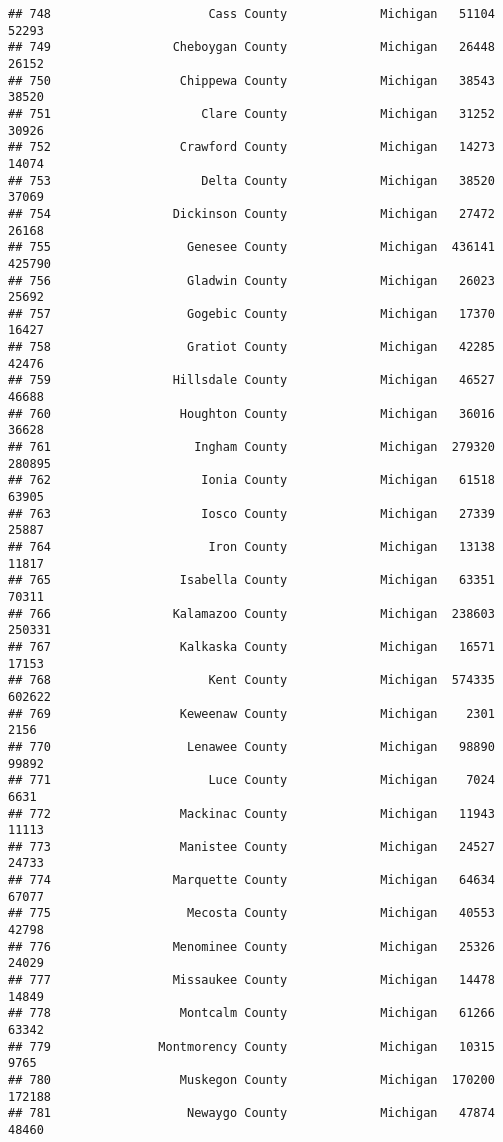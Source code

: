 \documentclass[
]{article}
\begin{document}
\begin{verbatim}
## 748                      Cass County             Michigan   51104   52293
## 749                 Cheboygan County             Michigan   26448   26152
## 750                  Chippewa County             Michigan   38543   38520
## 751                     Clare County             Michigan   31252   30926
## 752                  Crawford County             Michigan   14273   14074
## 753                     Delta County             Michigan   38520   37069
## 754                 Dickinson County             Michigan   27472   26168
## 755                   Genesee County             Michigan  436141  425790
## 756                   Gladwin County             Michigan   26023   25692
## 757                   Gogebic County             Michigan   17370   16427
## 758                   Gratiot County             Michigan   42285   42476
## 759                 Hillsdale County             Michigan   46527   46688
## 760                  Houghton County             Michigan   36016   36628
## 761                    Ingham County             Michigan  279320  280895
## 762                     Ionia County             Michigan   61518   63905
## 763                     Iosco County             Michigan   27339   25887
## 764                      Iron County             Michigan   13138   11817
## 765                  Isabella County             Michigan   63351   70311
## 766                 Kalamazoo County             Michigan  238603  250331
## 767                  Kalkaska County             Michigan   16571   17153
## 768                      Kent County             Michigan  574335  602622
## 769                  Keweenaw County             Michigan    2301    2156
## 770                   Lenawee County             Michigan   98890   99892
## 771                      Luce County             Michigan    7024    6631
## 772                  Mackinac County             Michigan   11943   11113
## 773                  Manistee County             Michigan   24527   24733
## 774                 Marquette County             Michigan   64634   67077
## 775                   Mecosta County             Michigan   40553   42798
## 776                 Menominee County             Michigan   25326   24029
## 777                 Missaukee County             Michigan   14478   14849
## 778                  Montcalm County             Michigan   61266   63342
## 779               Montmorency County             Michigan   10315    9765
## 780                  Muskegon County             Michigan  170200  172188
## 781                   Newaygo County             Michigan   47874   48460

\end{verbatim}
\end{document}
